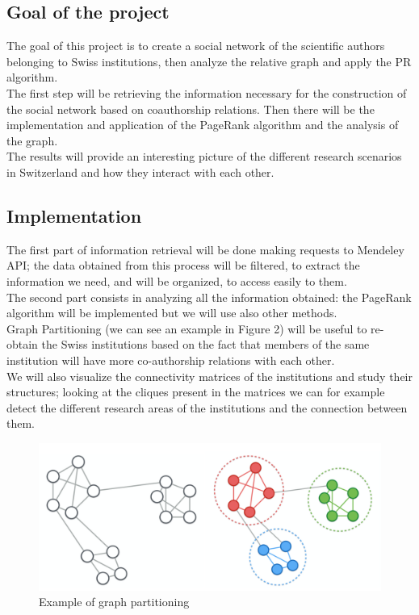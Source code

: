 \documentclass[12 pt]{article}
\begin{document}
\subsection*{Goal of the project}
The goal of this project is to create a social network of the scientific authors belonging to Swiss institutions, then analyze the relative graph and apply the PR algorithm.\\
The first step will be retrieving the information necessary for the construction of the social network based on coauthorship relations. Then there will be the implementation and application of the PageRank algorithm and the analysis of the graph.\\
The results will provide an interesting picture of the different research scenarios in Switzerland and how they interact with each other.

\subsection*{Implementation}
The first part of information retrieval will be done making requests to Mendeley API; the data obtained from this process will be filtered, to extract the information we need, and will be organized, to access easily to them.\\
The second part consists in analyzing all the information obtained: the PageRank algorithm will be implemented but we will use also other methods.\\
Graph Partitioning (we can see an example in Figure 2) will be useful to re-obtain the Swiss institutions based on the fact that members of the same institution will have more co-authorship relations with each other. \\
We will also visualize the connectivity matrices of the institutions and study their structures; looking at the cliques present in the matrices  we can for example detect the different research areas of the institutions and the connection between them.

\begin{figure} [h!]
\centering 
\includegraphics[scale=0.2]{graphPartitioning.png}
\caption{Example of graph partitioning}
\end{figure}
\end{document}
